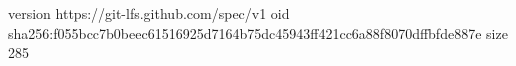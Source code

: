 version https://git-lfs.github.com/spec/v1
oid sha256:f055bcc7b0beec61516925d7164b75dc45943ff421cc6a88f8070dffbfde887e
size 285
